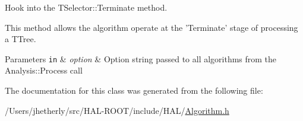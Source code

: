 Hook into the T\+Selector\+::\+Terminate method. 

This method allows the algorithm operate at the 'Terminate' stage of processing a T\+Tree. 
\begin{DoxyParams}[1]{Parameters}
\mbox{\tt in}  & {\em option} & Option string passed to all algorithms from the Analysis\+::\+Process call \\
\hline
\end{DoxyParams}


The documentation for this class was generated from the following file\+:\begin{DoxyCompactItemize}
\item 
/\+Users/jhetherly/src/\+H\+A\+L-\/\+R\+O\+O\+T/include/\+H\+A\+L/\hyperlink{_algorithm_8h}{Algorithm.\+h}\end{DoxyCompactItemize}
